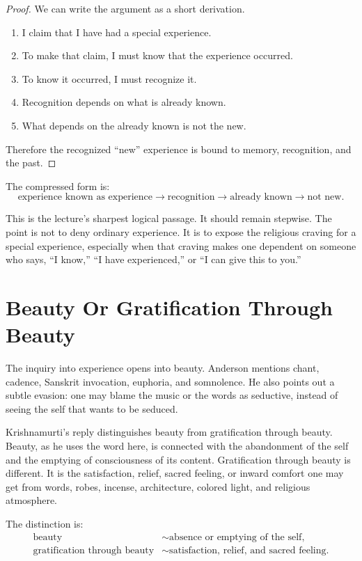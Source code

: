 \begin{proof}
We can write the argument as a short derivation.
\begin{enumerate}
\item I claim that I have had a special experience.
\item To make that claim, I must know that the experience occurred.
\item To know it occurred, I must recognize it.
\item Recognition depends on what is already known.
\item What depends on the already known is not the new.
\end{enumerate}
Therefore the recognized ``new'' experience is bound to memory, recognition, and the past.
\end{proof}

The compressed form is:
\begin{equation}
\text{experience known as experience}
\longrightarrow
\text{recognition}
\longrightarrow
\text{already known}
\longrightarrow
\text{not new}.
\end{equation}

This is the lecture's sharpest logical passage. It should remain stepwise. The point is not to deny ordinary experience. It is to expose the religious craving for a special experience, especially when that craving makes one dependent on someone who says, ``I know,'' ``I have experienced,'' or ``I can give this to you.''

\section{Beauty Or Gratification Through Beauty}

The inquiry into experience opens into beauty. Anderson mentions chant, cadence, Sanskrit invocation, euphoria, and somnolence. He also points out a subtle evasion: one may blame the music or the words as seductive, instead of seeing the self that wants to be seduced.

Krishnamurti's reply distinguishes beauty from gratification through beauty. Beauty, as he uses the word here, is connected with the abandonment of the self and the emptying of consciousness of its content. Gratification through beauty is different. It is the satisfaction, relief, sacred feeling, or inward comfort one may get from words, robes, incense, architecture, colored light, and religious atmosphere.

The distinction is:
\begin{align}
\text{beauty}
&\sim
\text{absence or emptying of the self},\\
\text{gratification through beauty}
&\sim
\text{satisfaction, relief, and sacred feeling}.
\end{align}

